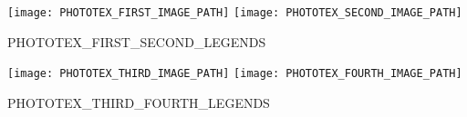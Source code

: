 \begin{minipage}[t][0.025\textheight][t]{\textwidth}
  \hfill\vfill
\end{minipage}
\begin{minipage}[t][0.45\textheight][t]{\textwidth}
  \begin{center}
    \texttt{[image: PHOTOTEX\_FIRST\_IMAGE\_PATH]}\hspace{2em}
    \texttt{[image: PHOTOTEX\_SECOND\_IMAGE\_PATH]}\\[1em]
  \end{center}
\end{minipage}
\begin{minipage}[t][0.03\textheight][t]{\textwidth}
  \begin{center}
    PHOTOTEX_FIRST_SECOND_LEGENDS\\[1em]
  \end{center}
\end{minipage}
\begin{minipage}[t][0.45\textheight][t]{\textwidth}
  \begin{center}
    \texttt{[image: PHOTOTEX\_THIRD\_IMAGE\_PATH]}\hspace{2em}
    \texttt{[image: PHOTOTEX\_FOURTH\_IMAGE\_PATH]}\\[1em]
  \end{center}
\end{minipage}
\begin{minipage}[t][0.03\textheight][t]{\textwidth}
  \begin{center}
    PHOTOTEX_THIRD_FOURTH_LEGENDS\\[1em]
  \end{center}
\end{minipage}



